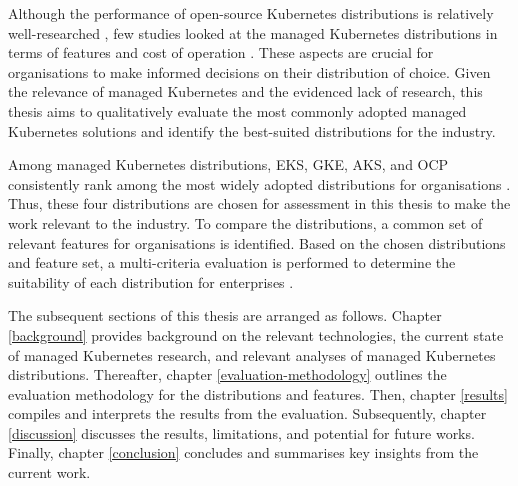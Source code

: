 Although the performance of open-source Kubernetes distributions is relatively well-researched \cite{bohmProfilingLightweightContainer2021, kjorveziroskiKubernetesDistributionsEdge2022, ascensaoAssessingKubernetesDistributions2024}, few studies looked at the managed Kubernetes distributions in terms of features and cost of operation \cite{pereiraferreiraPerformanceEvaluationContainers2019}. These aspects are crucial for organisations to make informed decisions on their distribution of choice. Given the relevance of managed Kubernetes and the evidenced lack of research, this thesis aims to qualitatively evaluate the most commonly adopted managed Kubernetes solutions and identify the best-suited distributions for the industry.

Among managed Kubernetes distributions, EKS, GKE, AKS, and OCP consistently rank among the most widely adopted distributions for organisations \cite{redhatinc.StateKubernetesSecurity2024, canonicalKubernetesCloudNative2022, portworxKubernetesAdoptionSurvey2021, broadcomStateKubernetes20232023}. Thus, these four distributions are chosen for assessment in this thesis to make the work relevant to the industry. To compare the distributions, a common set of relevant features for organisations is identified. Based on the chosen distributions and feature set, a multi-criteria evaluation is performed to determine the suitability of each distribution for enterprises \cite{5976164}.

The subsequent sections of this thesis are arranged as follows. Chapter \ref{background} provides background on the relevant technologies, the current state of managed Kubernetes research, and relevant analyses of managed Kubernetes distributions. Thereafter, chapter \ref{evaluation-methodology} outlines the evaluation methodology for the distributions and features. Then, chapter \ref{results} compiles and interprets the results from the evaluation. Subsequently, chapter \ref{discussion} discusses the results, limitations, and potential for future works. Finally, chapter \ref{conclusion} concludes and summarises key insights from the current work.



